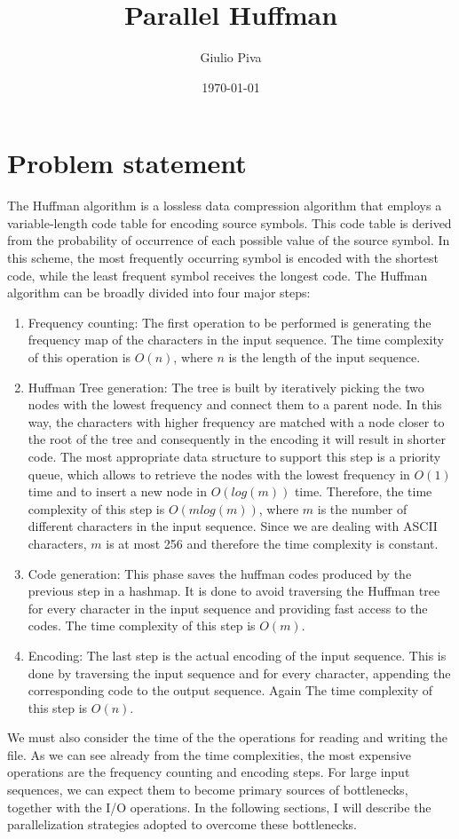 \documentclass{article}
\title{Parallel Huffman}
\author{Giulio Piva}
\date{\today}
\begin{document}
\maketitle

\tableofcontents
\break
\section{Problem statement}
The Huffman algorithm is a lossless data compression algorithm that employs a variable-length
code table for encoding source symbols. This code table is derived from the probability of
occurrence of each possible value of the source symbol. In this scheme, the most frequently
occurring symbol is encoded with the shortest code, while the least frequent symbol receives the
longest code. The Huffman algorithm can be broadly divided into four major steps:
\begin{enumerate}
    \item Frequency counting: The first operation to be performed is generating the frequency map of the characters in the input sequence.
          The time complexity of this operation is $O(n)$, where $n$ is the length of the input sequence.
    \item Huffman Tree generation: The tree is built by iteratively picking the two nodes with the lowest frequency and connect them to a parent node.
          In this way, the characters with higher frequency are matched with a node closer to the root of the tree and consequently
          in the encoding it will result in shorter code. The most appropriate data structure to
          support this step is a priority queue, which allows to retrieve the nodes with the lowest
          frequency in $O(1)$ time and to insert a new node in $O(log(m))$ time.
          Therefore, the time complexity of this step is $O(mlog(m))$, where $m$ is the number of different characters in the input sequence. Since
          we are dealing with ASCII characters, $m$ is at most 256 and therefore the time complexity is constant.
    \item Code generation: This phase saves the huffman codes produced by the previous step in a hashmap. It
          is done to avoid traversing the Huffman tree for every character in the input sequence and providing fast access to the codes.
          The time complexity of this step is $O(m)$.
    \item Encoding: The last step is the actual encoding of the input sequence. This is done by traversing the input sequence and
          for every character, appending the corresponding code to the output sequence. Again The time complexity of this step is $O(n)$.
\end{enumerate}
We must also consider the time of the the operations for reading and writing the file.
As we can see already from the time complexities, the most expensive operations are the frequency counting and encoding steps.
For large input sequences, we can expect them to become primary sources of bottlenecks, together with the I/O operations.
In the following sections, I will describe the parallelization strategies adopted to overcome these bottlenecks.
\end{document}
